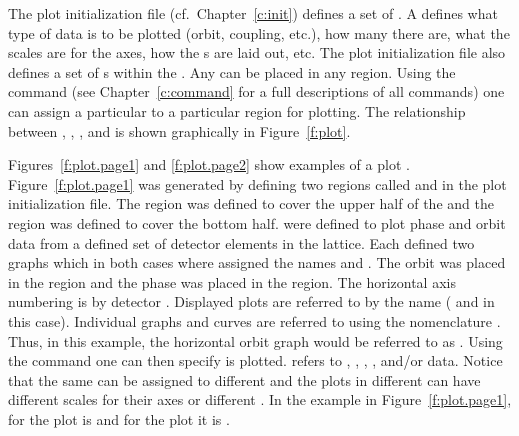 The plot initialization file (cf.~Chapter~\ref{c:init}) defines a set
of . A  defines what type of data is
to be plotted (orbit, coupling, etc.), how many  there are,
what the scales are for the  axes, how the s are
laid out, etc.  The plot initialization file also defines a set of
s within the . Any  can be
placed in any region. Using the  command (see
Chapter~\ref{c:command} for a full descriptions of all commands) one
can assign a particular  to a particular region for
plotting.  The relationship between , ,
, and  is shown graphically in
Figure~\ref{f:plot}.

Figures~\ref{f:plot.page1} and \ref{f:plot.page2} show examples of a
plot . Figure~\ref{f:plot.page1} was generated by defining
two regions called  and  in the plot initialization
file. The  region was defined to cover the upper half of the
 and the  region was defined to cover the bottom
half.  were defined to plot phase and orbit data
from a defined set of detector elements in the lattice. Each
 defined two graphs which in both cases where
assigned the names  and . The orbit  was
placed in the  region and the phase  was
placed in the  region. The horizontal axis numbering is by
detector .  Displayed plots are referred to by the
 name ( and  in this case). Individual
graphs and curves are referred to using the nomenclature
. Thus, in this example, the horizontal orbit graph
would be referred to as .  Using the  command one
can then specify  is plotted.  refers to
, , , , and/or
 data.  Notice that the same  can be
assigned to different  and the plots in different
 can have different scales for their axes or different
. In the example in Figure~\ref{f:plot.page1},  for
the  plot is  and for the  plot it is
.

